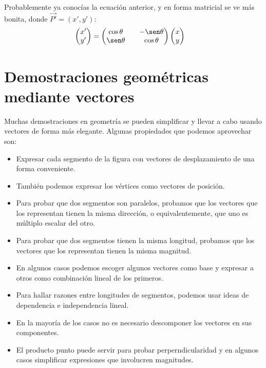 \documentclass[12pt, fleqn]{report}                             %
\theoremstyle{break}                                            %
\newcommand{\pVector}[1]                                        %
        { \ensuremath{\begin{pmatrix}#1\end{pmatrix}} }             %
\begin{document}
        	Probablemente ya conocías la ecuación anterior, y en forma matricial se ve más bonita, donde $\vec{P'}=(x', y')$:
        	\begin{align}
	        	\pVector{x' \\ y'} &= \pVector{\cos \theta && -\sen \theta \\ \sen \theta && \cos \theta} \pVector{x \\ y}
        	\end{align}
        
        \clearpage
        
        
        \section{Demostraciones geométricas mediante vectores}
        
        Muchas demostraciones en geometría se pueden simplificar y llevar a cabo usando vectores de forma más elegante. Algunas propiedades que podemos aprovechar son:
        \begin{itemize}\setlength\itemsep{0em}
        	\item Expresar cada segmento de la figura con vectores de desplazamiento de una forma conveniente.
        	\item También podemos expresar los vértices como vectores de posición.
        	\item Para probar que dos segmentos son paralelos, probamos que los vectores que los representan tienen la misma dirección, o equivalentemente, que uno es múltiplo escalar del otro.
        	\item Para probar que dos segmentos tienen la misma longitud, probamos que los vectores que los representan tienen la misma magnitud.
        	\item En algunos casos podemos escoger algunos vectores como base y expresar a otros como combinación lineal de los primeros.
        	\item Para hallar razones entre longitudes de segmentos, podemos usar ideas de dependencia e independencia lineal.
        	\item En la mayoría de los casos no es necesario descomponer los vectores en sus componentes.
        	\item El producto punto puede servir para probar perperndicularidad y en algunos casos simplificar expresiones que involucren magnitudes.
        \end{itemize}
    
\end{document}
